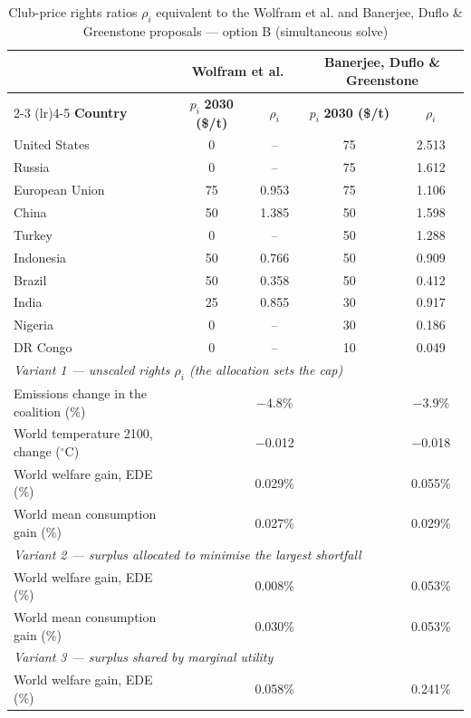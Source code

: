 \begin{table}[htbp]
\centering
\small
\caption{Club-price rights ratios $\rho_i$ equivalent to the Wolfram et al. and Banerjee, Duflo \& Greenstone proposals --- option B (simultaneous solve)}
\renewcommand{\arraystretch}{1.15}
\begin{tabular}{lcccc}
  \toprule
  & \multicolumn{2}{c}{\textbf{Wolfram et al.}} & \multicolumn{2}{c}{\textbf{Banerjee, Duflo \& Greenstone}} \\
  \cmidrule(lr){2-3} \cmidrule(lr){4-5}
  \textbf{Country} & $p_i$ \textbf{2030 (\$/t)} & $\rho_i$ & $p_i$ \textbf{2030 (\$/t)} & $\rho_i$ \\
  \midrule
  United States & 0 & -- & 75 & 2.513 \\
  Russia & 0 & -- & 75 & 1.612 \\
  European Union & 75 & 0.953 & 75 & 1.106 \\
  China & 50 & 1.385 & 50 & 1.598 \\
  Turkey & 0 & -- & 50 & 1.288 \\
  Indonesia & 50 & 0.766 & 50 & 0.909 \\
  Brazil & 50 & 0.358 & 50 & 0.412 \\
  India & 25 & 0.855 & 30 & 0.917 \\
  Nigeria & 0 & -- & 30 & 0.186 \\
  DR Congo & 0 & -- & 10 & 0.049 \\
  \midrule
  \multicolumn{5}{l}{\textit{Variant 1 --- unscaled rights $\rho_i$ (the allocation sets the cap)}} \\
  \quad Emissions change in the coalition (\%) &  & $-$4.8\% &  & $-$3.9\% \\
  \quad World temperature 2100, change ($^\circ$C) &  & $-$0.012 &  & $-$0.018 \\
  \quad World welfare gain, EDE (\%) &  & 0.029\% &  & 0.055\% \\
  \quad World mean consumption gain (\%) &  & 0.027\% &  & 0.029\% \\
  \midrule
  \multicolumn{5}{l}{\textit{Variant 2 --- surplus allocated to minimise the largest shortfall}} \\
  \quad World welfare gain, EDE (\%) &  & 0.008\% &  & 0.053\% \\
  \quad World mean consumption gain (\%) &  & 0.030\% &  & 0.053\% \\
  \midrule
  \multicolumn{5}{l}{\textit{Variant 3 --- surplus shared by marginal utility}} \\
  \quad World welfare gain, EDE (\%) &  & 0.058\% &  & 0.241\% \\

\end{tabular}
\end{table}
